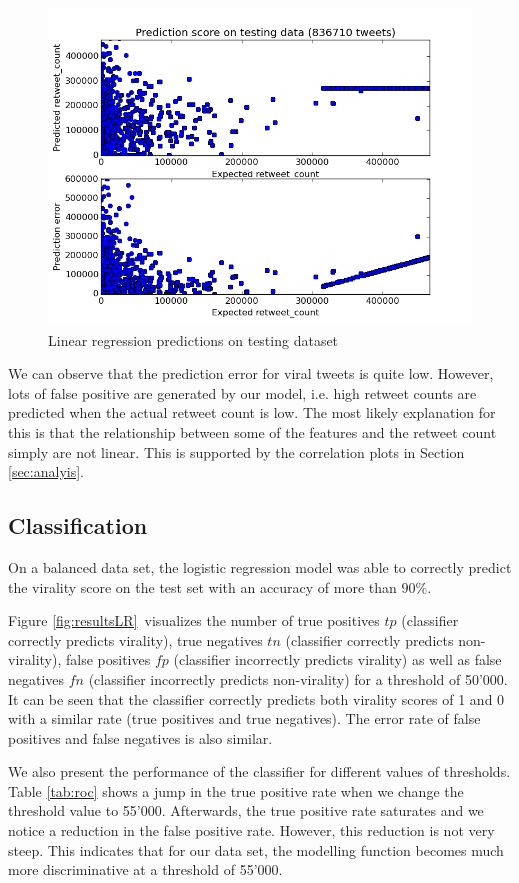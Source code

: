 \begin{figure}[H]
\centering
\includegraphics[width=0.6\linewidth]{img/prediction_error.png}
\caption{Linear regression predictions on testing dataset}
\label{fig:results}
\end{figure}

We can observe that the prediction error for viral tweets is quite low. However, lots of false positive are generated by our model, i.e. high retweet counts are predicted when the actual retweet count is low. The most likely explanation for this is that the relationship between some of the features and the retweet count simply are not linear. This is supported by the correlation plots in Section \ref{sec:analyis}.


\subsection{Classification}

On a balanced data set, the logistic regression model was able to correctly predict the virality score on the test set with an accuracy of more than $90\%$.

Figure \ref{fig:resultsLR} visualizes the number of true positives $tp$ (classifier correctly predicts virality), true negatives $tn$ (classifier correctly predicts non-virality), false positives $fp$ (classifier incorrectly predicts virality) as well as false negatives $fn$ (classifier incorrectly predicts non-virality) for a threshold of 50'000. It can be seen that the classifier correctly predicts both virality scores of 1 and 0 with a similar rate (true positives and true negatives). The error rate of false positives and false negatives is also similar. 

We also present the performance of the classifier for different values of thresholds. Table \ref{tab:roc} shows a jump in the true positive rate when we change the threshold value to 55'000. Afterwards, the true positive rate saturates and we notice a reduction in the false positive rate. However, this reduction is not very steep. This indicates that for our data set, the modelling function becomes much more discriminative at a threshold of 55'000. 


